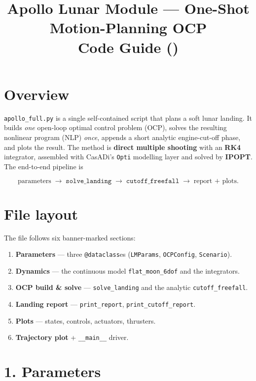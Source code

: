 \documentclass[11pt]{article}
\title{\textbf{Apollo Lunar Module --- One-Shot Motion-Planning OCP}\\[2pt]
\large Code Guide \;(\code{apollo\_full.py})}
\author{}
\date{}
\newcommand{\code}[1]{\texttt{#1}}
\begin{document}
\maketitle
\vspace{-2.5em}

\section*{Overview}

\code{apollo\_full.py} is a single self-contained script that plans a soft lunar
landing. It builds \emph{one} open-loop optimal control problem (OCP), solves the
resulting nonlinear program (NLP) \emph{once}, appends a short analytic
engine-cut-off phase, and plots the result. The method is \textbf{direct multiple
shooting} with an \textbf{RK4} integrator, assembled with CasADi's \code{Opti}
modelling layer and solved by \textbf{IPOPT}. The end-to-end pipeline is

\[
\text{parameters}\;\longrightarrow\;
\boxed{\code{solve\_landing}}\;\longrightarrow\;
\boxed{\code{cutoff\_freefall}}\;\longrightarrow\;
\text{report + plots}.
\]

\section*{File layout}

The file follows six banner-marked sections:
\begin{enumerate}\itemsep1pt
  \item \textbf{Parameters} --- three \code{@dataclass}es (\code{LMParams},
        \code{OCPConfig}, \code{Scenario}).
  \item \textbf{Dynamics} --- the continuous model \code{flat\_moon\_6dof} and the
        integrators.
  \item \textbf{OCP build \& solve} --- \code{solve\_landing} and the analytic
        \code{cutoff\_freefall}.
  \item \textbf{Landing report} --- \code{print\_report}, \code{print\_cutoff\_report}.
  \item \textbf{Plots} --- states, controls, actuators, thrusters.
  \item \textbf{Trajectory plot} + \code{\_\_main\_\_} driver.
\end{enumerate}

\section*{1. Parameters}
\end{document}

